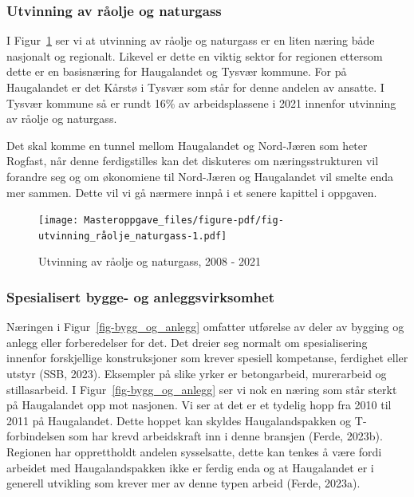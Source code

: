 \documentclass[
]{article}
\begin{document}
\hypertarget{utvinning-av-ruxe5olje-og-naturgass}{%
\subsubsection{Utvinning av råolje og
naturgass}\label{utvinning-av-ruxe5olje-og-naturgass}}

I Figur~\ref{fig-utvinning_råolje_naturgass} ser vi at utvinning av
råolje og naturgass er en liten næring både nasjonalt og regionalt.
Likevel er dette en viktig sektor for regionen ettersom dette er en
basisnæring for Haugalandet og Tysvær kommune. For på Haugalandet er det
Kårstø i Tysvær som står for denne andelen av ansatte. I Tysvær kommune
så er rundt 16\% av arbeidsplassene i 2021 innenfor utvinning av råolje
og naturgass.

Det skal komme en tunnel mellom Haugalandet og Nord-Jæren som heter
Rogfast, når denne ferdigstilles kan det diskuteres om næringsstrukturen
vil forandre seg og om økonomiene til Nord-Jæren og Haugalandet vil
smelte enda mer sammen. Dette vil vi gå nærmere innpå i et senere
kapittel i oppgaven.

\begin{figure}[H]

{\centering \texttt{[image: Masteroppgave\_files/figure-pdf/fig-utvinning\_råolje\_naturgass-1.pdf]}

}

\caption{\label{fig-utvinning_råolje_naturgass}Utvinning av råolje og
naturgass, 2008 - 2021}

\end{figure}

\hypertarget{spesialisert-bygge--og-anleggsvirksomhet}{%
\subsubsection{Spesialisert bygge- og
anleggsvirksomhet}\label{spesialisert-bygge--og-anleggsvirksomhet}}

Næringen i Figur~\ref{fig-bygg_og_anlegg} omfatter utførelse av deler av
bygging og anlegg eller forberedelser for det. Det dreier seg normalt om
spesialisering innenfor forskjellige konstruksjoner som krever spesiell
kompetanse, ferdighet eller utstyr (SSB, 2023). Eksempler på slike yrker
er betongarbeid, murerarbeid og stillasarbeid. I
Figur~\ref{fig-bygg_og_anlegg} ser vi nok en næring som står sterkt på
Haugalandet opp mot nasjonen. Vi ser at det er et tydelig hopp fra 2010
til 2011 på Haugalandet. Dette hoppet kan skyldes Haugalandspakken og
T-forbindelsen som har krevd arbeidskraft inn i denne bransjen (Ferde,
2023b). Regionen har opprettholdt andelen sysselsatte, dette kan tenkes
å være fordi arbeidet med Haugalandspakken ikke er ferdig enda og at
Haugalandet er i generell utvikling som krever mer av denne typen arbeid
(Ferde, 2023a).
\end{document}
